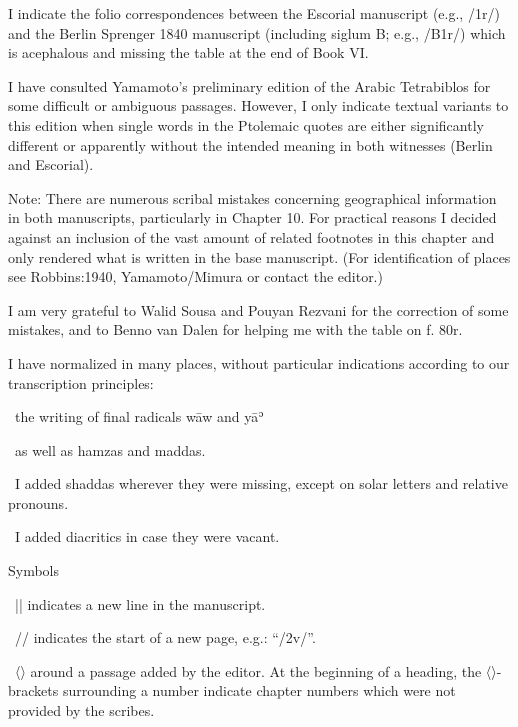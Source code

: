 \documentclass[11pt]{article}
\newcommand{\Sg}[1]{{\SgFont #1}}
\begin{document}
\par\smallskip\noindent I indicate the folio correspondences between the Escorial manuscript (e.g., /1r/) and the Berlin Sprenger 1840 manuscript (including siglum B; e.g., /B1r/) which is acephalous and missing the table at the end of Book VI.
\par\smallskip\noindent I have consulted Yamamoto’s preliminary edition of the Arabic Tetrabiblos for some difficult or ambiguous passages. However, I only indicate textual variants to this edition when single words in the Ptolemaic quotes are either significantly different or apparently without the intended meaning in both witnesses (Berlin and Escorial).
\par\smallskip\noindent Note: There are numerous scribal mistakes concerning geographical information in both manuscripts, particularly in Chapter 10. For practical reasons I decided against an inclusion of the vast amount of related footnotes in this chapter and only rendered what is written in the base manuscript. (For identification of places see Robbins:1940, Yamamoto/Mimura or contact the editor.)
\par\smallskip\noindent I am very grateful to Walid Sousa and Pouyan Rezvani for the correction of some mistakes, and to Benno van Dalen for helping me with the table on f. 80r.
\par\smallskip\noindent I have normalized in many places, without particular indications according to our transcription principles:
\par\hangindent=4mm\noindent\textbullet\ the writing of final radicals wāw and yāʾ
\par\hangindent=4mm\noindent\textbullet\ as well as hamzas and maddas.
\par\hangindent=4mm\noindent\textbullet\ I added shaddas wherever they were missing, except on solar letters and relative pronouns.
\par\hangindent=4mm\noindent\textbullet\ I added diacritics in case they were vacant.
\par\smallskip\noindent Symbols
\par\hangindent=4mm\noindent\textbullet\ || indicates a new line in the manuscript.
\par\hangindent=4mm\noindent\textbullet\ // indicates the start of a new page, e.g.: “/2v/”.
\par\hangindent=4mm\noindent\textbullet\ \Sg{〈}\Sg{〉} around a passage added by the editor. At the beginning of a heading, the \Sg{〈}\Sg{〉}-brackets surrounding a number indicate chapter numbers which were not provided by the scribes.
\end{document}
